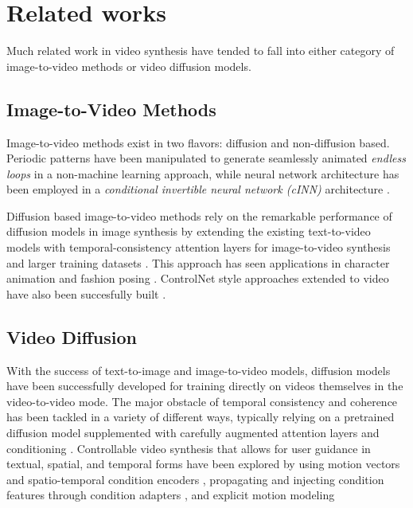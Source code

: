\section{Related works}
\label{sec:related_work}

Much related work in video synthesis have tended to fall into either category of image-to-video methods or video diffusion models.

\subsection{Image-to-Video Methods}

Image-to-video methods exist in two flavors: diffusion and non-diffusion based. Periodic patterns have been manipulated to generate seamlessly animated \emph{endless loops} \cite{Halperin_2021} in a non-machine learning approach, while neural network architecture has been employed in a \emph{conditional invertible neural network (cINN)} architecture \cite{dorkenwald2021stochasticimagetovideosynthesisusing}. 

Diffusion based image-to-video methods rely on the remarkable performance of diffusion models in image synthesis by extending the existing text-to-video models with temporal-consistency attention layers for image-to-video synthesis and larger training datasets \cite{blattmann2023stablevideodiffusionscaling}. This approach has seen applications in character animation \cite{hu2024animateanyoneconsistentcontrollable} and fashion posing \cite{52750}. ControlNet \cite{zhang2023addingconditionalcontroltexttoimage} style approaches extended to video have also been succesfully built \cite{zhang2023controlvideotrainingfreecontrollabletexttovideo}.


\subsection{Video Diffusion}

With the success of text-to-image and image-to-video models, diffusion models have been successfully developed for training directly on videos themselves in the video-to-video mode. The major obstacle of temporal consistency and coherence has been tackled in a variety of different ways, typically relying on a pretrained diffusion model supplemented with carefully augmented attention layers and conditioning \cite{melnik2024videodiffusionmodelssurvey}. Controllable video synthesis that allows for user guidance in textual, spatial, and temporal forms have been explored by using motion vectors and spatio-temporal condition encoders \cite{wang2023videocomposercompositionalvideosynthesis}, propagating and injecting condition features through condition adapters \cite{wang2024easycontroltransfercontrolnetvideo}, and explicit motion modeling \cite{shi2024motioni2vconsistentcontrollableimagetovideo}

